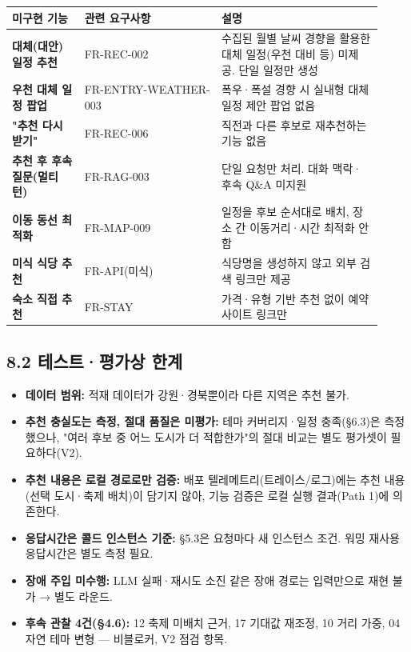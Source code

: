 \documentclass[11pt,a4paper]{article}
\newcommand{\DocNeedspace}[1]{\par\ifdim\dimexpr\pagegoal-\pagetotal\relax<#1\newpage\fi}
\providecommand{\tightlist}{\setlength{\itemsep}{0pt}\setlength{\parskip}{0pt}}
\begin{document}
\begin{small}
\begin{longtable}{@{}>{\RaggedRight\arraybackslash}m{0.180\linewidth}>{\RaggedRight\arraybackslash}m{0.340\linewidth}>{\RaggedRight\arraybackslash}m{0.400\linewidth}@{}}
\toprule\noalign{}
미구현 기능 & 관련 요구사항 & 설명 \\
\midrule\noalign{}
\endhead
\bottomrule\noalign{}
\endlastfoot
\textbf{대체(대안) 일정 추천} & FR-REC-002 & 수집된 월별 날씨 경향을 활용한 대체 일정(우천 대비 등) 미제공. 단일 일정만 생성 \\
\textbf{우천 대체 일정 팝업} & FR-ENTRY-WEATHER-003 & 폭우·폭설 경향 시 실내형 대체 일정 제안 팝업 없음 \\
\textbf{"추천 다시 받기"} & FR-REC-006 & 직전과 다른 후보로 재추천하는 기능 없음 \\
\textbf{추천 후 후속 질문(멀티턴)} & FR-RAG-003 & 단일 요청만 처리. 대화 맥락·후속 Q\&A 미지원 \\
\textbf{이동 동선 최적화} & FR-MAP-009 & 일정을 후보 순서대로 배치, 장소 간 이동거리·시간 최적화 안 함 \\
\textbf{미식 식당 추천} & FR-API(미식) & 식당명을 생성하지 않고 외부 검색 링크만 제공 \\
\textbf{숙소 직접 추천} & FR-STAY & 가격·유형 기반 추천 없이 예약 사이트 링크만 \\
\end{longtable}
\end{small}

\DocNeedspace{6\baselineskip}
\subsection*{8.2 테스트·평가상 한계}

\begin{itemize}
\tightlist
\item
  \textbf{데이터 범위:} 적재 데이터가 강원·경북뿐이라 다른 지역은 추천 불가.
\item
  \textbf{추천 충실도는 측정, 절대 품질은 미평가:} 테마 커버리지·일정 충족(§6.3)은 측정했으나, "여러 후보 중 어느 도시가 더 적합한가"의 절대 비교는 별도 평가셋이 필요하다(V2).
\item
  \textbf{추천 내용은 로컬 경로로만 검증:} 배포 텔레메트리(트레이스/로그)에는 추천 내용(선택 도시·축제 배치)이 담기지 않아, 기능 검증은 로컬 실행 결과(Path 1)에 의존한다.
\item
  \textbf{응답시간은 콜드 인스턴스 기준:} §5.3은 요청마다 새 인스턴스 조건. 워밍 재사용 응답시간은 별도 측정 필요.
\item
  \textbf{장애 주입 미수행:} LLM 실패·재시도 소진 같은 장애 경로는 입력만으로 재현 불가 → 별도 라운드.
\item
  \textbf{후속 관찰 4건(§4.6):} 12 축제 미배치 근거, 17 기대값 재조정, 10 거리 가중, 04 자연 테마 변형 --- 비블로커, V2 점검 항목.
\end{itemize}
\end{document}
